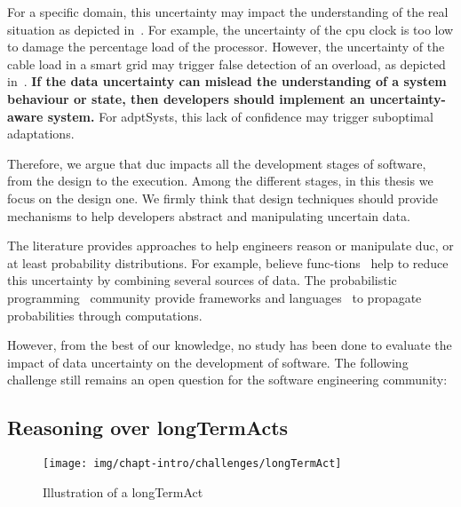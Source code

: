 For a specific domain, this uncertainty may impact the understanding of the real situation as depicted in~.
For example, the uncertainty of the \gls{cpu} clock is too low to damage the percentage load of the processor.
However, the uncertainty of the cable load in a smart grid may trigger false detection of an overload, as depicted in~.
\textbf{If the data uncertainty can mislead the understanding of a system behaviour or state, then developers should implement an uncertainty-aware system.}
For \glspl{adptSyst}, this lack of confidence may trigger suboptimal adaptations.

Therefore, we argue that \gls{duc} impacts all the development stages of software, from the design to the execution.
Among the different stages, in this thesis we focus on the design one.
We firmly think that design techniques should provide mechanisms to help developers abstract and manipulating uncertain data.

The literature provides approaches to help engineers reason or manipulate \gls{duc}, or at least probability distributions.
For example, believe func-\linebreak{}tions~\cite{shafer1992dempster} help to reduce this uncertainty by combining several sources of data.
The probabilistic programming~\cite{DBLP:conf/icse/GordonHNR14} community provide frameworks and languages~\cite{url:InferNET18, baudin2017openturns} to propagate probabilities through computations.

However, from the best of our knowledge, no study has been done to evaluate the impact of data uncertainty on the development of software.
The following challenge still remains an open question for the software engineering community:
\vspace{-2em}

\subsection[Reasoning over long-term actions]{Reasoning over \glspl{longTermAct}}
\label{sec:intro:challenges:longTermAct}

\begin{figure}
	\centering
	\texttt{[image: img/chapt-intro/challenges/longTermAct]}
	\caption{Illustration of a \gls{longTermAct}}
	\label{fig:intro:chal:longTermAct}
\end{figure}

